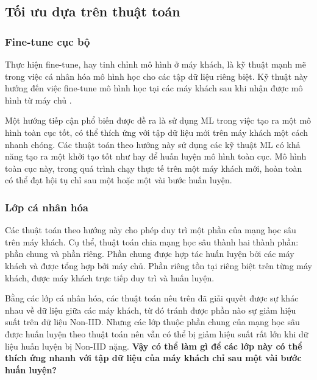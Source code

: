 \subsection{Tối ưu dựa trên thuật toán}

\subsubsection{Fine-tune cục bộ}

Thực hiện fine-tune, hay tinh chỉnh mô hình ở máy khách, là kỹ thuật mạnh mẽ trong việc cá nhân hóa mô hình học cho các tập dữ liệu riêng biệt. Kỹ thuật này hướng đến việc fine-tune mô hình học tại các máy khách sau khi nhận được mô hình từ máy chủ \cite{wang2019federated}.

Một hướng tiếp cận phổ biến được đề ra là sử dụng ML trong việc tạo ra một mô hình toàn cục tốt, có thể thích ứng với tập dữ liệu mới trên máy khách một cách nhanh chóng. Các thuật toán theo hướng này \parencite{chen2018federated, fallah2020personalized} sử dụng các kỹ thuật ML có khả năng tạo ra một khởi tạo tốt như  \cite{finn2017model} hay  \cite{li2017meta} để huấn luyện mô hình toàn cục. Mô hình toàn cục này, trong quá trình chạy thực tế trên một máy khách mới, hoàn toàn có thể đạt hội tụ chỉ sau một hoặc một vài bước huấn luyện.

\subsubsection{Lớp cá nhân hóa}

Các thuật toán theo hướng này cho phép duy trì một phần của mạng học sâu trên máy khách. Cụ thể, thuật toán chia mạng học sâu thành hai thành phần: phần chung và phần riêng. Phần chung được hợp tác huấn luyện bởi các máy khách và được tổng hợp bởi máy chủ. Phần riêng tồn tại riêng biệt trên từng máy khách, được máy khách trực tiếp duy trì và huấn luyện.

\label{open_question}
Bằng các lớp cá nhân hóa, các thuật toán nêu trên đã giải quyết được sự khác nhau về dữ liệu giữa các máy khách, từ đó tránh được phần nào sự giảm hiệu suất trên dữ liệu Non-IID. Nhưng các lớp thuộc phần chung của mạng học sâu được huấn luyện theo thuật toán  nên vẫn có thể bị giảm hiệu suất rất lớn khi dữ liệu huấn luyện bị Non-IID nặng. \textbf{Vậy có thể làm gì để các lớp này có thể thích ứng nhanh với tập dữ liệu của máy khách chỉ sau một vài bước huấn luyện?}

